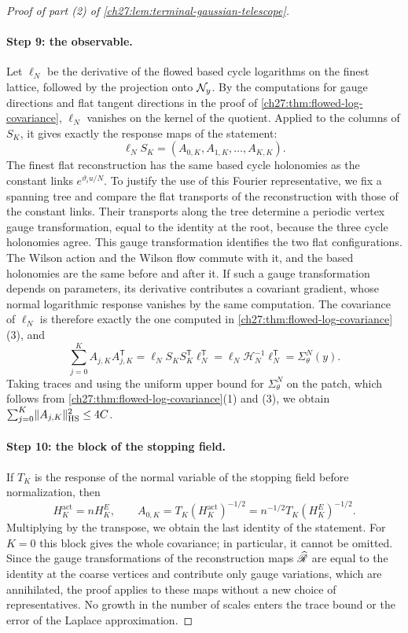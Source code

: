 \begin{proof}[Proof of part (2) of \cref{ch27:lem:terminal-gaussian-telescope}]
\paragraph{Step 9: the observable.}
Let $\ell_N$ be the derivative of the flowed based cycle logarithms on the finest lattice, followed by the projection onto $\mathcal N_{y}$. By the computations for gauge directions and flat tangent directions in the proof of \cref{ch27:thm:flowed-log-covariance}, $\ell_N$ vanishes on the kernel of the quotient. Applied to the columns of $S_K$, it gives exactly the response maps of the statement:
\[
 \ell_NS_K=(A_{0,K},A_{1,K},\dots,A_{K,K}).
\]
The finest flat reconstruction has the same based cycle holonomies as the constant links $e^{\vartheta_iu/N}$. To justify the use of this Fourier representative, we fix a spanning tree and compare the flat transports of the reconstruction with those of the constant links. Their transports along the tree determine a periodic vertex gauge transformation, equal to the identity at the root, because the three cycle holonomies agree. This gauge transformation identifies the two flat configurations. The Wilson action and the Wilson flow commute with it, and the based holonomies are the same before and after it. If such a gauge transformation depends on parameters, its derivative contributes a covariant gradient, whose normal logarithmic response vanishes by the same computation. The covariance of $\ell_N$ is therefore exactly the one computed in \cref{ch27:thm:flowed-log-covariance}(3), and
\[
 \sum_{j=0}^KA_{j,K}A_{j,K}^{\mathsf T}=\ell_NS_KS_K^{\mathsf T}\ell_N^{\mathsf T}=\ell_N\mathcal H_N^{-1}\ell_N^{\mathsf T}=\Sigma_\theta^N(y).
\]
Taking traces and using the uniform upper bound for $\Sigma_\theta^N$ on the patch, which follows from \cref{ch27:thm:flowed-log-covariance}(1) and (3), we obtain $\sum_{j=0}^K\lVert A_{j,K}\rVert_{\mathrm{HS}}^2\le4C$.

\paragraph{Step 10: the block of the stopping field.}
If $T_K$ is the response of the normal variable of the stopping field before normalization, then
\[
 H_K^{\mathrm{act}}=nH_K^E,\qquad A_{0,K}=T_K(H_K^{\mathrm{act}})^{-1/2}=n^{-1/2}T_K(H_K^E)^{-1/2}.
\]
Multiplying by the transpose, we obtain the last identity of the statement. For $K=0$ this block gives the whole covariance; in particular, it cannot be omitted. Since the gauge transformations of the reconstruction maps $\widehat{\mathscr R}$ are equal to the identity at the coarse vertices and contribute only gauge variations, which are annihilated, the proof applies to these maps without a new choice of representatives. No growth in the number of scales enters the trace bound or the error of the Laplace approximation.
\end{proof}

